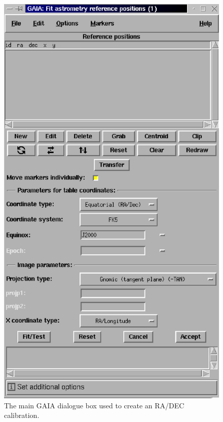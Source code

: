 \documentclass[twoside,11pt]{article}
\newenvironment{latexonly}{}{}
\renewcommand{\_}{\texttt{\symbol{95}}}
\begin{document}
\begin{enumerate}
\begin{latexonly}
  \vspace{2mm}
  \begin{figure}[htb]
  \begin{center}
  \includegraphics[clip,scale=0.5]{sun223_figures/gaia1.eps}
  \caption{The main GAIA dialogue box used to create an RA/DEC calibration.}
  \label{fig:gaia1}
  \end{center}
  \end{figure}
\end{latexonly}


\end{enumerate}
\end{document}
